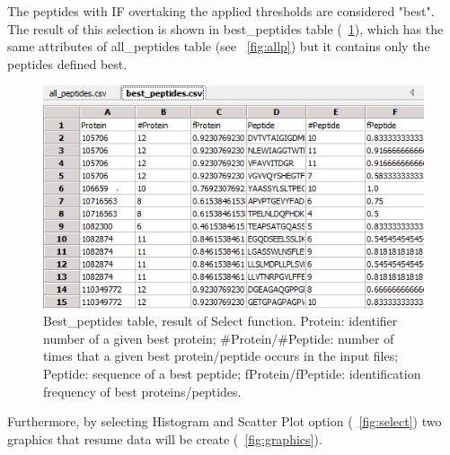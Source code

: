 \documentclass[a4paper,14pt]{extarticle}
\begin{document}
The peptides with IF overtaking the applied thresholds are considered "best". The result of this selection is shown in best\_peptides table (\figurename~\ref{fig:best}), which has the same attributes of all\_peptides table (see \figurename~\ref{fig:allp}) but it contains only the peptides defined best. 
\begin{figure}[ht]
\begin{center}
\includegraphics[scale=0.8]{Eppi_best_peptides.png}	
\caption{Best\_peptides table, result of Select function. Protein: identifier number of a given best protein; \#Protein/\#Peptide: number of times that a given best protein/peptide occurs in the input files; Peptide: sequence of a best peptide; fProtein/fPeptide: identification frequency of best proteins/peptides.}\label{fig:best}
\end{center}
\end{figure}
 
Furthermore, by selecting Histogram and Scatter Plot option (\figurename~\ref{fig:select}) two graphics that resume data will be create (\figurename~\ref{fig:graphics}).
 
\end{document}
